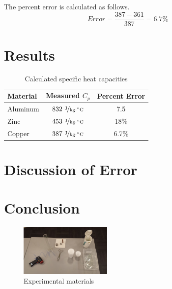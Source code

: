 \documentclass{article}
\begin{document}
The percent error is calculated as follows.
$$Error=\frac{387-361}{387}=6.7\%$$



\section{Results}

\begin{table}[htbp]
\begin{center}
\footnotesize
\begin{tabular}{lcc}
\toprule
 Material  & Measured $C_p$ & Percent Error\\                                                      
\midrule
  
    Aluminum   & $832\   \nicefrac{ \text{J}}{\text{kg}\cdot {}^{\circ}\text{C}}$ &   7.5   \\
    Zinc     & $453\  \nicefrac{ \text{J}}{\text{kg}\cdot {}^{\circ}\text{C}}$  & 18\%   \\
     Copper     & $387\   \nicefrac{ \text{J}}{\text{kg}\cdot {}^{\circ}\text{C}}$   & 6.7\%   \\
    
\bottomrule
\end{tabular}
\end{center}
  \caption{Calculated specific heat capacities}
  \label{tab:font-sizes}
\end{table}


 \section{Discussion of Error}
 
 \section{Conclusion}


\begin{figure}[h]
\begin{center}
\includegraphics[width=0.4\textwidth]{pic} %
\caption{Experimental materials}
\end{center}
\end{figure}

\newpage








\end{document}

